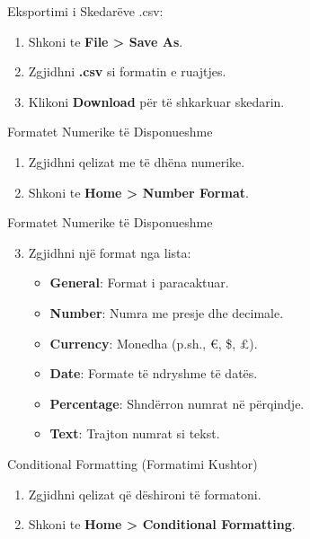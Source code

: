 \documentclass[
  ignorenonframetext,
]{beamer}
\begin{document}
\begin{frame}{Eksportimi i Skedarëve .csv:}
\label{eksportimi-i-skedaruxebve-.csv}
\begin{enumerate}
\item
  Shkoni te \textbf{File \textgreater{} Save As}.
\item
  Zgjidhni \textbf{.csv} si formatin e ruajtjes.
\item
  Klikoni \textbf{Download} për të shkarkuar skedarin.
\end{enumerate}
\end{frame}

\begin{frame}{Formatet Numerike të Disponueshme}
\label{formatet-numerike-tuxeb-disponueshme}
\begin{enumerate}
\item
  Zgjidhni qelizat me të dhëna numerike.
\item
  Shkoni te \textbf{Home \textgreater{} Number Format}.
\end{enumerate}
\end{frame}

\begin{frame}{Formatet Numerike të Disponueshme}
\label{formatet-numerike-tuxeb-disponueshme-1}
\begin{enumerate}
\setcounter{enumi}{2}
\item
  Zgjidhni një format nga lista:

  \begin{itemize}
  \item
    \textbf{General}: Format i paracaktuar.
  \item
    \textbf{Number}: Numra me presje dhe decimale.
  \item
    \textbf{Currency}: Monedha (p.sh., €, \$, £).
  \item
    \textbf{Date}: Formate të ndryshme të datës.
  \item
    \textbf{Percentage}: Shndërron numrat në përqindje.
  \item
    \textbf{Text}: Trajton numrat si tekst.
  \end{itemize}
\end{enumerate}
\end{frame}

\begin{frame}{Conditional Formatting (Formatimi Kushtor)}
\label{conditional-formatting-formatimi-kushtor}
\begin{enumerate}
\item
  Zgjidhni qelizat që dëshironi të formatoni.
\item
  Shkoni te \textbf{Home \textgreater{} Conditional Formatting}.
\end{enumerate}
\end{frame}
\end{document}
